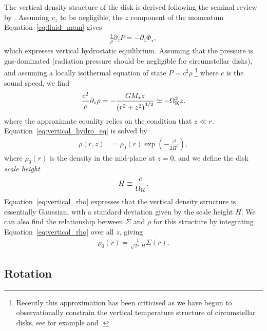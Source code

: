 The vertical density structure of the disk is derived following the seminal review by \citet{pringle1981}.
Assuming $v_z$ to be negligible, the $z$ component of the momentum Equation~\eqref{eq:fluid_mom} gives
\begin{align}
    \frac{1}{\rho} \partial_z P = -\partial_z \Phi_\star,
\end{align}
which expresses vertical hydrostatic equilibrium.
Assuming that the pressure is gas-dominated (radiation pressure should be negligible for circumstellar disks), and assuming a locally isothermal equation of state $P=c^2 \rho$ \footnote{Recently this approximation has been criticised as we have begun to observationally constrain the vertical temperature structure of circumstellar disks, see for example \citet{pinte2018} and \citet{calahan2021}.} where $c$ is the sound speed, we find 
\begin{align}
    \frac{c^2}{\rho} \partial_z \rho = - \frac{G M_\star z}{\left(r^2 + z^2\right)^{3/2}} \simeq - \Omega_{\rm K}^2 z. \label{eq:vertical_hydro_eq}
\end{align}
where the approximate equality relies on the condition that $z \ll r$.
Equation~\eqref{eq:vertical_hydro_eq} is solved by
\begin{align}
    \rho(r,z) &= \rho_0(r) \exp{\left( -\frac{z^2}{2 H^2} \right)}, \label{eq:vertical_rho}
\end{align}
where $\rho_0(r)$ is the density in the mid-plane at $z=0$, and we define the disk \textit{scale height}
\begin{align}
    H \equiv\frac{c}{\Omega_{\rm K}}. \label{eq:scale_height}
\end{align}
Equation~\eqref{eq:vertical_rho} expresses that the vertical density structure is essentially Gaussian, with a standard deviation given by the scale height $H$.
We can also find the relationship between $\Sigma$ and $\rho$ for this structure by integrating Equation~\eqref{eq:vertical_rho} over all $z$, giving
\begin{align}
    \rho_0(r) = \frac{1}{\sqrt{2\pi} H} \Sigma(r). \label{eq:surf_dens_to_dens}
\end{align}

\subsection{Rotation} \label{sec:disk_rotation}


